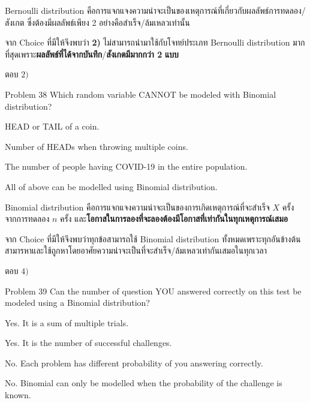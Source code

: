 \documentclass[11pt]{scrartcl}
\begin{document}
\begin{solutionbox}
  Bernoulli distribution คือการแจกแจงความน่าจะเป็นของเหตุการณ์ที่เกี่ยวกับผลลัพธ์การทดลอง/สังเกต 
  ซึ่งต้องมีผลลัพธ์เพียง 2 อย่างคือสำเร็จ/ล้มเหลวเท่านั้น

  จาก Choice ที่มีให้จึงพบว่า \textbf{2)} ไม่สามารถนำมาใช้กับโจทย์ประเภท Bernoulli distribution มากที่สุดเพราะ\textbf{ผลลัพธ์ที่ได้จากบันทึก}/\textbf{สังเกตมีมากกว่า 2} \textbf{แบบ}

  ตอบ $\boxed{2)}$
\end{solutionbox}

\newpage

\begin{problembox}{Problem 38}
Which random variable CANNOT be modeled with Binomial distribution?
 
\begin{choices}
\item HEAD or TAIL of a coin.
\item Number of HEADs when throwing multiple coins.
\item The number of people having COVID-19 in the entire population.
\item All of above can be modelled using Binomial distribution.
\end{choices}
\end{problembox}

\begin{solutionbox}
  Binomial distribution คือการแจกแจงความน่าจะเป็นของการเกิดเหตุการณ์ที่จะสำเร็จ $X$ ครั้ง จากการทดลอง $n$ ครั้ง และ\textbf{โอกาสในการลองที่จะลองต้องมีโอกาสที่เท่ากันในทุกเหตุการณ์เสมอ}

  จาก Choice ที่มีให้จึงพบว่าทุกข้อสามารถใช้ Binomial distribution ทั้งหมดเพราะทุกอันข้างต้นสามารหาและใช้ถูกหาโดยอาศัยความน่าจะเป็นที่จะสำเร็จ/ล้มเหลวเท่ากันเสมอในทุกเวลา

  ตอบ $\boxed{4)}$
\end{solutionbox}
 
\begin{problembox}{Problem 39}
Can the number of question YOU answered correctly on this test be modeled using a Binomial distribution?
 
\begin{choices}
\item Yes. It is a sum of multiple trials.
\item Yes. It is the number of successful challenges.
\item No. Each problem has different probability of you answering correctly.
\item No. Binomial can only be modelled when the probability of the challenge is known.
\end{choices}
\end{problembox}
 
\end{document}
